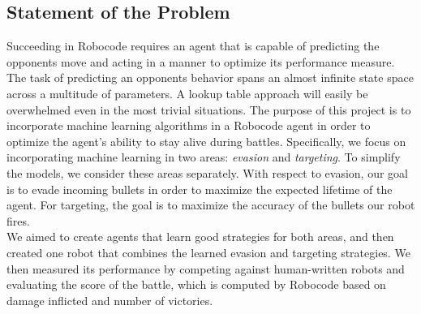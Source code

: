 \documentclass{article}
\newcommand{\xxx}[1]{\textcolor{red}{#1}}
\theoremstyle{plain}
\theoremstyle{definition}
\theoremstyle{remark}
\begin{document}
\subsection*{Statement of the Problem}


Succeeding in Robocode requires an agent that is capable of predicting the opponents move and acting in a manner to optimize its performance measure. The task of predicting an opponents behavior spans an almost infinite state space across a multitude of parameters. A lookup table approach will easily be overwhelmed even in the most trivial situations. The purpose of this project is to incorporate machine learning algorithms in a Robocode agent in order to optimize the agent's ability to stay alive during battles. Specifically, we focus on incorporating machine learning in two areas: \emph{evasion} and \emph{targeting}. To simplify the models, we consider these areas separately. With respect to evasion, our goal is to evade incoming bullets in order to maximize the expected lifetime of the agent. For targeting, the goal is to maximize the accuracy of the bullets our robot fires.\\

We aimed to create agents that learn good strategies for both areas, and then created one robot that combines the learned evasion and targeting strategies. We then measured its performance by competing against human-written robots and evaluating the score of the battle, which is computed by Robocode based on damage inflicted and number of victories.


\end{document}
